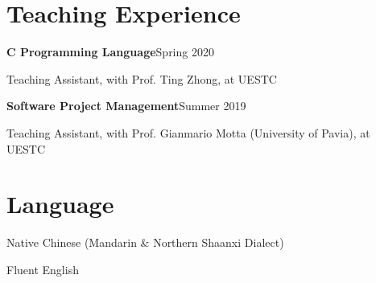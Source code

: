 \documentclass{article}
\begin{document}
\section*{Teaching Experience}
\vspace{-4pt}
\indent

\textbf{C Programming Language}\hfill Spring 2020

\hspace{2em}Teaching Assistant, with Prof. Ting Zhong, at UESTC

\textbf{Software Project Management}\hfill Summer 2019

\hspace{2em}Teaching Assistant, with Prof. Gianmario Motta (University of Pavia), at UESTC







\vspace{-8pt}
\section*{Language}
\vspace{-4pt}
\indent

Native Chinese (Mandarin \& Northern Shaanxi Dialect)

Fluent English



\end{document}

